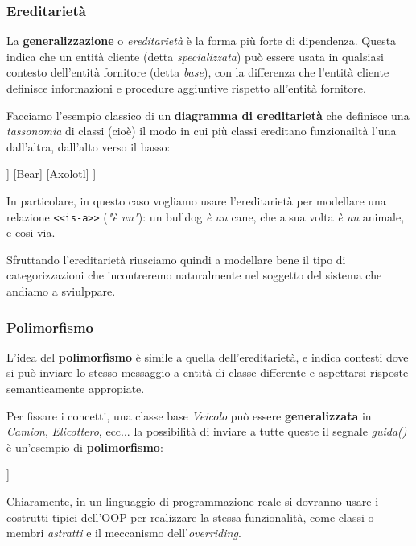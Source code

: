 \documentclass[a4paper,11pt]{article}
\begin{document}
\subsubsection{Ereditarietà}
La \textbf{generalizzazione} o \textit{ereditarietà} è la forma più forte di dipendenza.
Questa indica che un entità cliente (detta \textit{specializzata}) può essere usata in qualsiasi contesto dell'entità fornitore (detta \textit{base}), con la differenza che l'entità cliente definisce informazioni e procedure aggiuntive rispetto all'entità fornitore.

Facciamo l'esempio classico di un \textbf{diagramma di ereditarietà} che definisce una \textit{tassonomia} di classi (cioè) il modo in cui più classi ereditano funzionailtà l'una dall'altra, dall'alto verso il basso:
\begin{center}
	\begin{forest}
		[Animal, rectstyle
			[Dog
				[Bulldog]
				[Chihuaha]
				[Hound]
			]
			[Bear]
			[Axolotl]
		]	
	\end{forest}
\end{center}

In particolare, in questo caso vogliamo usare l'ereditarietà per modellare una relazione \lstinline|<<is-a>>| (\textit{"è un"}): un bulldog \textit{è un} cane, che a sua volta \textit{è un} animale, e cosi via.

Sfruttando l'ereditarietà riusciamo quindi a modellare bene il tipo di categorizzazioni che incontreremo naturalmente nel soggetto del sistema che andiamo a sviulppare.

\subsubsection{Polimorfismo}
L'idea del \textbf{polimorfismo} è simile a quella dell'ereditarietà, e indica contesti dove si può inviare lo stesso messaggio a entità di classe differente e aspettarsi risposte semanticamente appropiate.

Per fissare i concetti, una classe base \textit{Veicolo} può essere \textbf{generalizzata} in \textit{Camion}, \textit{Elicottero}, ecc... la possibilità di inviare a tutte queste il segnale \textit{guida()} è un'esempio di \textbf{polimorfismo}:
\begin{center}
	\begin{forest}
		[Conducente, rectstyle
			[Camion, edge label={node[midway,left]{guida()}}]
			[Elicottero, edge label={node[midway,right]{guida()}}]
		]	
	\end{forest}
\end{center}

Chiaramente, in un linguaggio di programmazione reale si dovranno usare i costrutti tipici dell'OOP per realizzare la stessa funzionalità, come classi o membri \textit{astratti} e il meccanismo dell'\textit{overriding}.
\end{document}
